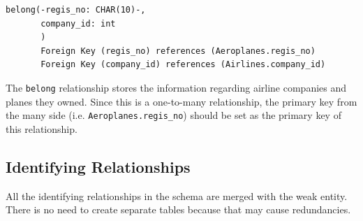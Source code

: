 \documentclass{article}
\begin{document}
	\begin{lstlisting}[keepspaces=true]	
belong(-regis_no: CHAR(10)-,
       company_id: int
       )
       Foreign Key (regis_no) references (Aeroplanes.regis_no)
       Foreign Key (company_id) references (Airlines.company_id)
	\end{lstlisting}

	The \texttt{belong} relationship stores the information regarding airline companies and planes they owned. Since this is a one-to-many relationship, the primary key from the many side (i.e. \texttt{Aeroplanes.regis\_no}) should be set as the primary key of this relationship.
	
	\subsection{Identifying Relationships}
	All the identifying relationships in the schema are merged with the weak entity. There is no need to create separate tables because that may cause redundancies.
	
\end{document}

